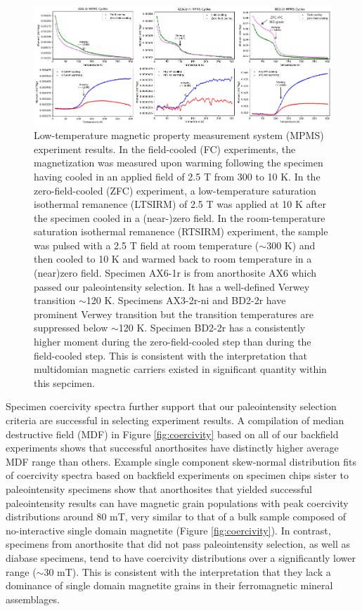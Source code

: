 \documentclass[draft]{agujournal2019}
\begin{document}
\begin{figure}[h!]
\noindent\includegraphics[width=\textwidth]{MPMS.pdf}
\centering
\caption{\footnotesize{Low-temperature magnetic property measurement system (MPMS) experiment results. In the field-cooled (FC) experiments, the magnetization was measured upon warming following the specimen having cooled in an applied field of 2.5 T from 300 to 10 K. In the zero-field-cooled (ZFC) experiment, a low-temperature saturation isothermal remanence (LTSIRM) of 2.5 T was applied at 10 K after the specimen cooled in a (near-)zero field. In the room-temperature saturation isothermal remanence (RTSIRM) experiment, the sample was pulsed with a 2.5 T field at room temperature ($\sim$300 K) and then cooled to 10 K and warmed back to room temperature in a (near)zero field. Specimen AX6-1r is from anorthosite AX6 which passed our paleointensity selection. It has a well-defined Verwey transition $\sim$120 K. Specimens AX3-2r-ni and BD2-2r have prominent Verwey transition but the transition temperatures are suppressed below $\sim$120 K. Specimen BD2-2r has a consistently higher moment during the zero-field-cooled step than during the field-cooled step. This is consistent with the interpretation that multidomian magnetic carriers existed in significant quantity within this sepcimen.}}
\label{fig:MPMS}
\end{figure}

Specimen coercivity spectra further support that our paleointensity selection criteria are successful in selecting experiment results. A compilation of median destructive field (MDF) in Figure \ref{fig:coercivity} based on all of our backfield experiments shows that successful anorthosites have distinctly higher average MDF range than others. Example single component skew-normal distribution fits of coercivity spectra based on backfield experiments on specimen chips sister to paleointensity specimens show that anorthosites that yielded successful paleointensity results can have magnetic grain populations with peak coercivity distributions around 80 mT, very similar to that of a bulk sample composed of no-interactive single domain magnetite (Figure \ref{fig:coercivity}). In contrast, specimens from anorthosite that did not pass paleointensity selection, as well as diabase specimens, tend to have coercivity distributions over a significantly lower range ($\sim$30 mT). This is consistent with the interpretation that they lack a dominance of single domain magnetite grains in their ferromagnetic mineral assemblages.
\end{document}

